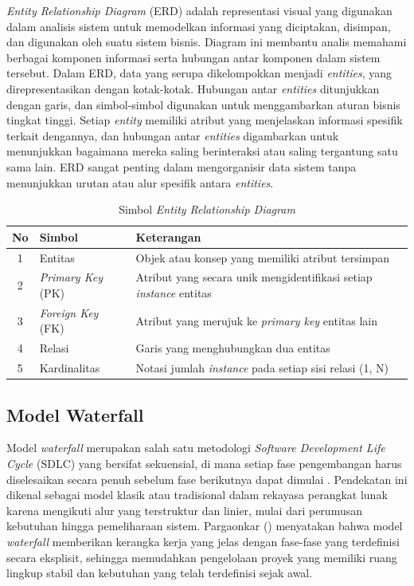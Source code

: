 \textit{Entity Relationship Diagram} (ERD) adalah representasi visual yang digunakan dalam analisis sistem untuk memodelkan informasi yang diciptakan, disimpan, dan digunakan oleh suatu sistem bisnis. Diagram ini membantu analis memahami berbagai komponen informasi serta hubungan antar komponen dalam sistem tersebut. Dalam ERD, data yang serupa dikelompokkan menjadi \textit{entities}, yang direpresentasikan dengan kotak-kotak. Hubungan antar \textit{entities} ditunjukkan dengan garis, dan simbol-simbol digunakan untuk menggambarkan aturan bisnis tingkat tinggi. Setiap \textit{entity} memiliki atribut yang menjelaskan informasi spesifik terkait dengannya, dan hubungan antar \textit{entities} digambarkan untuk menunjukkan bagaimana mereka saling berinteraksi atau saling tergantung satu sama lain. ERD sangat penting dalam mengorganisir data sistem tanpa menunjukkan urutan atau alur spesifik antara \textit{entities}.

\begin{table}[H]
\centering
\caption{Simbol \textit{Entity Relationship Diagram}}
\label{tab:simbol-erd}
\begin{tabular}{|c|l|p{7cm}|}
\hline
\textbf{No} & \textbf{Simbol} & \textbf{Keterangan} \\
\hline
1 & Entitas & Objek atau konsep yang memiliki atribut tersimpan \\
\hline
2 & \textit{Primary Key} (PK) & Atribut yang secara unik mengidentifikasi setiap \textit{instance} entitas \\
\hline
3 & \textit{Foreign Key} (FK) & Atribut yang merujuk ke \textit{primary key} entitas lain \\
\hline
4 & Relasi & Garis yang menghubungkan dua entitas \\
\hline
5 & Kardinalitas & Notasi jumlah \textit{instance} pada setiap sisi relasi (1, N) \\
\hline
\end{tabular}
\end{table}



\subsection{Model Waterfall}\label{model-waterfall}

Model \textit{waterfall} merupakan salah satu metodologi \textit{Software Development Life Cycle} (SDLC) yang bersifat sekuensial, di mana setiap fase pengembangan harus diselesaikan secara penuh sebelum fase berikutnya dapat dimulai \cite{pressman2010se}. Pendekatan ini dikenal sebagai model klasik atau tradisional dalam rekayasa perangkat lunak karena mengikuti alur yang terstruktur dan linier, mulai dari perumusan kebutuhan hingga pemeliharaan sistem. Pargaonkar (\citeyear{pargaonkar2023sdlc}) menyatakan bahwa model \textit{waterfall} memberikan kerangka kerja yang jelas dengan fase-fase yang terdefinisi secara eksplisit, sehingga memudahkan pengelolaan proyek yang memiliki ruang lingkup stabil dan kebutuhan yang telah terdefinisi sejak awal.

